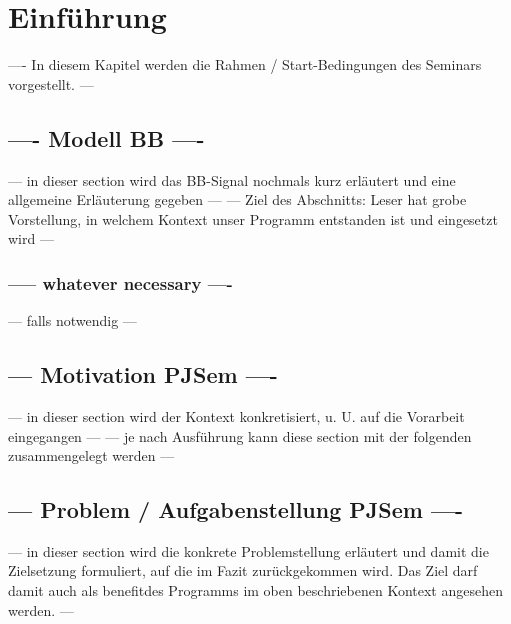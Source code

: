 \documentclass[../Report.tex]{subfiles}
\begin{document}
\chapter{Einführung}
\label{chap:einfuehrung}
---- In diesem Kapitel werden die Rahmen / Start-Bedingungen des Seminars vorgestellt. --- 

\section[--- name in inhaltsverzeichnis ---]{---- Modell BB ----}
\label{sec:einf.modell_BB}
--- in dieser section wird das BB-Signal nochmals kurz erläutert und eine allgemeine Erläuterung gegeben ---
--- Ziel des Abschnitts: Leser hat grobe Vorstellung, in welchem Kontext unser Programm entstanden ist und eingesetzt wird ---

\subsection{ ----- whatever necessary ----}
\label{subsec:einf.modell_BB.name}
--- falls notwendig ---

\section{ --- Motivation PJSem ---- }
\label{sec:einf.motivation}
--- in dieser section wird der Kontext konkretisiert, u. U. auf die Vorarbeit eingegangen --- 
--- je nach Ausführung kann diese section mit der folgenden zusammengelegt werden --- 

\section{ --- Problem / Aufgabenstellung PJSem ---- }
\label{sec:einf.problem}
--- in dieser section wird die konkrete Problemstellung erläutert und damit die Zielsetzung formuliert, 
auf die im Fazit zurückgekommen wird. Das Ziel darf damit auch als \glqq benefit\grqq des Programms im oben beschriebenen Kontext angesehen werden. --- 
\\
\end{document}
